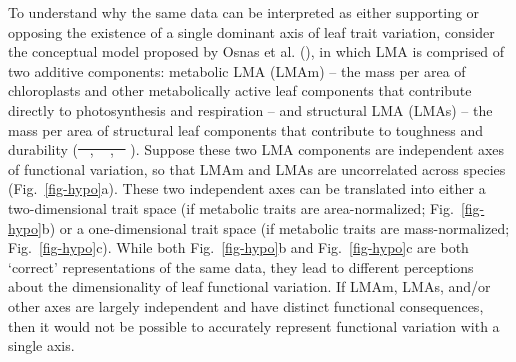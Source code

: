 \documentclass[
  12pt,
  letterpaper,
  DIV=11,
  numbers=noendperiod]{scrartcl}
\providecommand{\DIFadd}[1]{{\protect\color{blue}\uwave{#1}}} %
\providecommand{\DIFdel}[1]{{\protect\color{red}\sout{#1}}}                      %
\providecommand{\DIFaddbegin}{} %
\providecommand{\DIFaddend}{} %
\providecommand{\DIFdelbegin}{} %
\providecommand{\DIFdelend}{} %
\newcommand{\DIFscaledelfig}{0.5}
\newlength{\DIFdelgraphicswidth} %
\newlength{\DIFdelgraphicsheight} %
\newcommand{\DIFaddincludegraphics}[2][]{{\color{blue}\fbox{\DIFOincludegraphics[#1]{#2}}}} %
\newcommand{\DIFdelincludegraphics}[2][]{%
\sbox{\DIFdelgraphicsbox}{\DIFOincludegraphics[#1]{#2}}%
\settoboxwidth{\DIFdelgraphicswidth}{\DIFdelgraphicsbox} %
\settoboxtotalheight{\DIFdelgraphicsheight}{\DIFdelgraphicsbox} %
\scalebox{\DIFscaledelfig}{%
\parbox[b]{\DIFdelgraphicswidth}{\usebox{\DIFdelgraphicsbox}\\[-\baselineskip] \rule{\DIFdelgraphicswidth}{0em}}\llap{\resizebox{\DIFdelgraphicswidth}{\DIFdelgraphicsheight}{%
\setlength{\unitlength}{\DIFdelgraphicswidth}%
\begin{picture}(1,1)%
\thicklines\linethickness{2pt} %
{\color[rgb]{1,0,0}\put(0,0){\framebox(1,1){}}}%
{\color[rgb]{1,0,0}\put(0,0){\line( 1,1){1}}}%
{\color[rgb]{1,0,0}\put(0,1){\line(1,-1){1}}}%
\end{picture}%
}\hspace*{3pt}}} %
} %
\DeclareRobustCommand{\DIFaddbegin}{\DIFOaddbegin \let\includegraphics\DIFaddincludegraphics} %
\DeclareRobustCommand{\DIFaddend}{\DIFOaddend \let\includegraphics\DIFOincludegraphics} %
\DeclareRobustCommand{\DIFdelbegin}{\DIFOdelbegin \let\includegraphics\DIFdelincludegraphics} %
\DeclareRobustCommand{\DIFdelend}{\DIFOaddend \let\includegraphics\DIFOincludegraphics} %
\begin{document}
To understand why the same data can be interpreted as either supporting
or opposing the existence of a single dominant axis of leaf trait
variation, consider the conceptual model proposed by Osnas et al.
(), in which LMA is comprised of two
additive components: metabolic LMA (LMAm) -- the mass per area of
chloroplasts and other metabolically active leaf components that
contribute directly to photosynthesis and respiration -- and structural
LMA (LMAs) -- the mass per area of structural leaf components that
contribute to toughness and durability
(\DIFdelbegin \DIFdel{\mbox{%
\citeproc{ref-Kitajima2012}{Kitajima et al. 2012}}\hspace{0pt}%
,
\mbox{%
\citeproc{ref-Kitajima2016}{2016}}\hspace{0pt}%
,
\mbox{%
\citeproc{ref-Onoda2017}{Onoda et al.
2017}}\hspace{0pt}%
}\DIFdelend \DIFaddbegin \DIFadd{\mbox{%
\citeproc{ref-Kitajima2016}{Kitajima et al., 2016}}\hspace{0pt}%
,
\mbox{%
\citeproc{ref-Kitajima2012}{2012}}\hspace{0pt}%
; \mbox{%
\citeproc{ref-Onoda2017}{Onoda et
al., 2017}}\hspace{0pt}%
}\DIFaddend ). Suppose these two LMA components are independent axes of
functional variation, so that LMAm and LMAs are uncorrelated across
species (Fig.~\ref{fig-hypo}a). These two independent axes can be
translated into either a two-dimensional trait space (if metabolic
traits are area-normalized; Fig.~\ref{fig-hypo}b) or a one-dimensional
trait space (if metabolic traits are mass-normalized;
Fig.~\ref{fig-hypo}c). While both Fig.~\ref{fig-hypo}b and
Fig.~\ref{fig-hypo}c are both `correct' representations of the same
data, they lead to different perceptions about the dimensionality of
leaf functional variation. If LMAm, LMAs, and/or other axes are largely
independent and have distinct functional consequences, then it would not
be possible to accurately represent functional variation with a single
axis.
\end{document}
